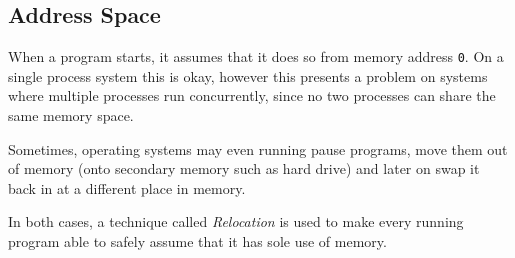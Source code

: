 
\subsection{Address Space}


When a program starts, it assumes that it does so from memory address {\tt 0}.
On a single process system this is okay, however this presents a problem on
systems where multiple processes run concurrently, since no two processes can
share the same memory space.

Sometimes, operating systems may even running pause programs, move them out of
memory (onto secondary memory such as hard drive) and later on swap it back in
at a different place in memory.

In both cases, a technique called {\it Relocation} is used to make every running
program able to safely assume that it has sole use of memory.

